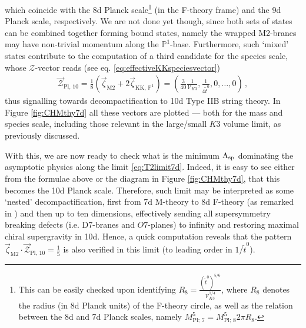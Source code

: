 %
which coincide with the 8d Planck scale\footnote{This can be easily checked upon identifying $R_8 = \frac{(\tilde{t}^0)^{5/6}}{\mathcal{V}_{K3}^{1/4}}$, where $R_8$ denotes the radius (in 8d Planck units) of the F-theory circle, as well as the relation between the 8d and 7d Planck scales, namely $M_{\text{Pl};\, 7}^5= M_{\text{Pl};\, 8}^5 2\pi R_8$.} (in the F-theory frame) and the 9d Planck scale, respectively. We are not done yet though, since both sets of states can be combined together forming bound states, namely the wrapped M2-branes may have non-trivial momentum along the $\mathbb{P}^1$-base. Furthermore, such `mixed' states contribute to the computation of a third candidate for the species scale, whose $\mathcal{Z}$-vector reads (see eq. \eqref{eq:effectiveKKspeciesvector})
%
\begin{align}\label{eq:speciesKK10d}
	\vec{\mathcal{Z}}_{\text{Pl},\, 10} = \frac{1}{8} \left( \vec{\zeta}_{\text{M2}} + 2 \vec{\zeta}_{\text{KK},\, \mathbb{P}^1}\right) = \left(\frac{3}{40} \frac{1}{\mathcal{V}_{K3}}, \frac{1}{4 \tilde{t}^0}, 0, \ldots, 0 \right)\, , 
\end{align}
%
thus signalling towards decompactification to 10d Type IIB string theory. In Figure \ref{fig:CHMthy7d} all these vectors are plotted --- both for the mass and species scale, including those relevant in the large/small $K3$ volume limit, as previously discussed. 
	
With this, we are now ready to check what is the minimum $\Lambda_{\text{sp}}$ dominating the asymptotic physics along the limit \eqref{eq:T2limit7d}. Indeed, it is easy to see either from the formulae above or the diagram in Figure \ref{fig:CHMthy7d}, that this becomes the 10d Planck scale. Therefore, such limit may be interpreted as some `nested' decompactification, first from 7d M-theory to 8d F-theory (as remarked in \cite{Lee:2019xtm}) and then up to ten dimensions, effectively sending all supersymmetry breaking defects (i.e. D7-branes and $O7$-planes) to infinity and restoring maximal chiral supergravity in 10d. Hence, a quick computation reveals that the pattern $\vec{\zeta}_{\text{M2}} \cdot \vec{\mathcal{Z}}_{\text{Pl},\, 10}= \frac{1}{5}$ is also verified in this limit (to leading order in $1/\tilde{t}^0$). 
	
